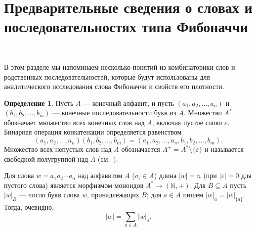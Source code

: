 \documentclass[a4paper,14pt]{extreport}
\theoremstyle{plain}
\theoremstyle{definition}
\newtheorem{definition}{Определение}[section]
\theoremstyle{remark}
\begin{document}
\section{Предварительные сведения о словах и последовательностях типа Фибоначчи}~\label{sec3.1}

В этом разделе мы напоминаем несколько понятий из комбинаторики слов и родственных последовательностей, которые будут использованы для аналитического исследования слова Фибоначчи и свойств его плотности.

\begin{definition}
	Пусть $A$ --- конечный алфавит, и пусть $(a_1,a_2,\ldots,a_n)$ и $(b_1,b_2,\ldots,b_m)$ --- конечные последовательности букв из $A$. Множество $A^*$ обозначает множество всех конечных слов над $A$, включая пустое слово $\varepsilon$. Бинарная операция конкатенации определяется равенством
	\begin{equation}
		(a_1,a_2,\dots,a_n) (b_1,b_2,\dots,b_m)
		= (a_1,a_2,\dots,a_n,b_1,b_2,\dots,b_m).
	\end{equation}
	Множество всех непустых слов над $A$ обозначается $A^+ = A^*\setminus\{\varepsilon\}$ и называется свободной полугруппой над $A$ (см.~\cite{Lothaire}).
\end{definition}

Для слова $w = a_1 a_2 \cdots a_n$ над алфавитом $A$ ($a_i \in A$) длина $|w| = n$ (при $|\varepsilon| = 0$ для пустого слова) является морфизмом моноидов $A^* \to (\mathbb{N},+)$. Для $B \subseteq A$ пусть $|w|_B$ --- число букв слова $w$, принадлежащих $B$; для $a \in A$ пишем $|w|_a = |w|_{\{a\}}$. Тогда, очевидно,
\begin{equation}
	|w| = \sum_{a \in A} |w|_a.
\end{equation}
\end{document}
